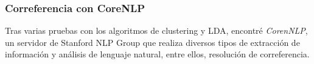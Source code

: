 \documentclass{pre-tfg}
\begin{document}








\subsubsection{Correferencia con CoreNLP}
\label{sec:correferencia}
Tras varias pruebas con los algoritmos de clustering y LDA, encontré \textit{CorenNLP}, un servidor de Stanford NLP Group que realiza diversos tipos de extracción de información y análisis de lenguaje natural, entre ellos, resolución de correferencia.
\end{document}
